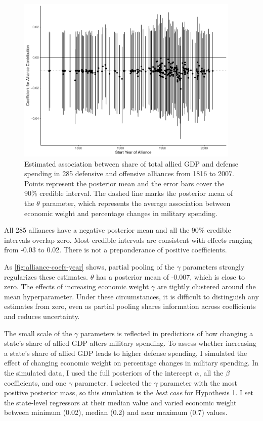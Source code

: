 \documentclass[12pt]{article}
\begin{document}
\begin{figure}[htbp]
	\centering
		\includegraphics[width=0.95\textwidth]{alliance-coefs-year.pdf}
	\caption{Estimated association between share of total allied GDP and defense spending in 285 defensive and offensive alliances from 1816 to 2007. Points represent the posterior mean and the error bars cover the 90\% credible interval. The dashed line marks the posterior mean of the $\theta$ parameter, which represents the average association between economic weight and percentage changes in military spending.}
	\label{fig:alliance-coefs-year}
\end{figure}


All 285 alliances have a negative posterior mean and all the 90\% credible intervals overlap zero. 
Most credible intervals are consistent with effects ranging from -0.03 to 0.02. 
There is not a preponderance of positive coefficients. 


As \autoref{fig:alliance-coefs-year} shows, partial pooling of the $\gamma$ parameters strongly regularizes these estimates. 
$\theta$ has a posterior mean of -0.007, which is close to zero. 
The effects of increasing economic weight $\gamma$ are tightly clustered around the mean hyperparameter. 
Under these circumstances, it is difficult to distinguish any estimates from zero, even as partial pooling shares information across coefficients and reduces uncertainty. 


The small scale of the $\gamma$ parameters is reflected in predictions of how changing a state's share of allied GDP alters military spending. 
To assess whether increasing a state's share of allied GDP leads to higher defense spending, I simulated the effect of changing economic weight on percentage changes in military spending. 
In the simulated data, I used the full posteriors of the intercept $\alpha$, all the $\beta$ coefficients, and one $\gamma$ parameter. 
I selected the $\gamma$ parameter with the most positive posterior mass, so this simulation is the \emph{best case} for Hypothesis 1. 
I set the state-level regressors at their median value and varied economic weight between minimum (0.02), median (0.2) and near maximum (0.7) values. 
\end{document}
